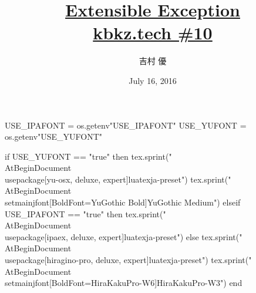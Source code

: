 \hypersetup{colorlinks,linkcolor=,urlcolor=links}

\beamertemplatenavigationsymbolsempty

\usepackage{luacode}
\usepackage{luatexja}
\usepackage{pgfpages}
\usepackage[osf]{mathpazo}

\begin{luacode*}
  USE_IPAFONT = os.getenv"USE_IPAFONT"
  USE_YUFONT = os.getenv"USE_YUFONT"
  
  if USE_YUFONT == "true" then
    tex.sprint("\\AtBeginDocument{\\usepackage[yu-osx, deluxe, expert]{luatexja-preset}}")
    tex.sprint("\\AtBeginDocument{\\setmainjfont[BoldFont=YuGothic Bold]{YuGothic Medium}}")
  elseif USE_IPAFONT == "true" then
    tex.sprint("\\AtBeginDocument{\\usepackage[ipaex, deluxe, expert]{luatexja-preset}}")
  else
    tex.sprint("\\AtBeginDocument{\\usepackage[hiragino-pro, deluxe, expert]{luatexja-preset}}")
    tex.sprint("\\AtBeginDocument{\\setmainjfont[BoldFont=HiraKakuPro-W6]{HiraKakuPro-W3}}")
  end
\end{luacode*}

\usepackage{epigraph}
\usepackage{etoolbox}
\usepackage{tikz}
\usepackage{framed}
\usepackage{libertine}
\usepackage[final]{listings}
\usepackage{amsmath}
\usepackage{mathtools}
\usepackage{tikz-qtree}



\setmainfont[Numbers=OldStyle, BoldFont=Palatino Bold]{Palatino}
\setsansfont{CMU Sans Serif}
\setmonofont{CMU Typewriter Text}

\title[\href{https://github.com/y-yu/extensibleException}{Extensible Exception}]{%
  \href{https://github.com/y-yu/extensibleException}{Extensible Exception} \\
  {\normalsize \href{http://kbkz.connpass.com/event/32420/}{kbkz.tech \#10}} \\
}
\author{吉村 優}
\date{July 16, 2016}

